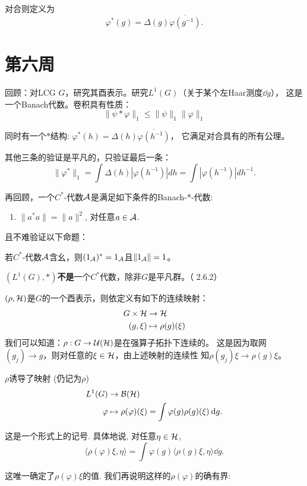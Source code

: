 对合则定义为\[\varphi^*(g) = \Delta(g)\overline{\varphi(g^{-1})}.\]
\section{第六周}
回顾：对LCG $G$，研究其酉表示。研究$L^1(G)$（关于某个左Haar测度$\dd g$），
这是一个Banach代数。卷积具有性质：
\[\|\psi* \varphi\|_1 \leqslant \|\psi\|_1\|\varphi\|_1\]

同时有一个$*$结构: $\varphi^*(h) = \Delta(h)\overline{\varphi(h^{-1})}$，
它满足对合具有的所有公理。

其他三条的验证是平凡的，只验证最后一条：
\[\|\varphi^*\|_1 = \int \Delta(h)|\varphi(h^{-1})| dh = \int |\varphi(h^{-1})| dh^{-1}.\]

再回顾，一个$C^*$-代数$\mathcal{A}$是满足如下条件的Banach-*-代数:
    \begin{enumerate}
        \item[(iv)'] $\|a^*a\| = \|a\|^2$, 对任意$a \in \mathcal{A}$.
    \end{enumerate}

且不难验证以下命题：
\begin{proposition}
    若$C^*$-代数$\mathcal{A}$含幺，则$(1_{\mathcal{A}})^*  = 1_{\mathcal{A}}$且$\|1_{\mathcal{A}}\| = 1$。
\end{proposition}

\begin{remark}
    $(L^1(G),*)$\textbf{不是}一个$C^*$代数，除非$G$是平凡群。（\cite{Pr} 2.6.2）
\end{remark}

$(\rho,\mathcal{H})$是$G$的一个酉表示，则依定义有如下的连续映射：
\begin{align*}
    G \times \mathcal{H} & \to \mathcal{H} \\ (g,\xi) & \mapsto \rho(g)(\xi)
\end{align*}
我们可以知道：$\rho:G \to \mathcal{U}(\mathcal{H})$是在强算子拓扑下连续的。
这是因为取网$(g_j) \to g$，则对任意的$\xi \in \mathcal{H}$，由上述映射的连续性
知$\rho(g_j)\xi \to \rho(g)\xi$。

$\rho$诱导了映射 (仍记为$\rho$)\begin{align*}
    L^1(G) & \to \mathcal{B}(\mathcal{H}) \\ \varphi&  \mapsto \rho(\varphi)(\xi) = \int \varphi(g)\rho(g)(\xi) \:\mathrm{d} g.
\end{align*}

这是一个形式上的记号. 具体地说, 对任意$\eta \in \mathcal{H}$, \[\langle \rho(\varphi)\xi,\eta\rangle = \int \varphi(g)\langle \rho(g)\xi,\eta\rangle \dd g.\]

这唯一确定了$\rho(\varphi)\xi$的值. 我们再说明这样的$\rho(\varphi)$的确有界:


